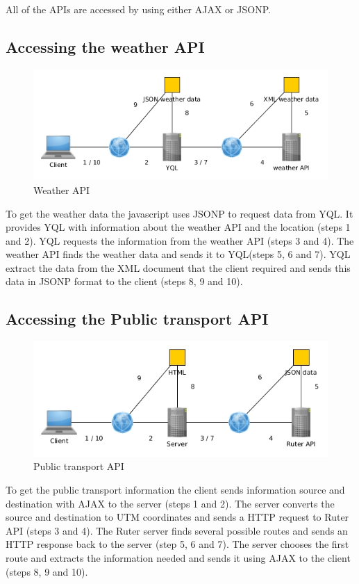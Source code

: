 \documentclass[10pt,a4paper]{article}
\begin{document}
All of the APIs are accessed by using either AJAX or JSONP.

\subsection{Accessing the weather API}
\begin{figure}
\centering
\includegraphics[width=\textwidth]{../weather/access}

\caption{Weather API}
\label{fig:weather}
\end{figure}

To get the weather data the javascript uses JSONP to request data from YQL. It provides YQL with information about the weather API and the location (steps 1 and 2). YQL requests the information from the weather API (steps 3 and 4). The weather API finds the weather data and sends it to YQL(steps 5, 6 and 7). YQL extract the data from the XML document that the client required and sends this data in JSONP format to the client (steps 8, 9 and 10).

\subsection{Accessing the Public transport API}
\begin{figure}
\centering
\includegraphics[width=\textwidth]{../ruter/access}
\caption{Public transport API}
\label{fig:public}
\end{figure}
To get the public transport information the client sends information source and destination with AJAX to the server (steps 1 and 2). The server converts the source and destination to UTM coordinates and sends a HTTP request to Ruter API (steps 3 and 4). The Ruter server finds several possible routes and sends an HTTP response back to the server (step 5, 6 and 7). The server chooses the first route and extracts the information needed and sends it using AJAX to the client (steps 8, 9 and 10).
\end{document}
